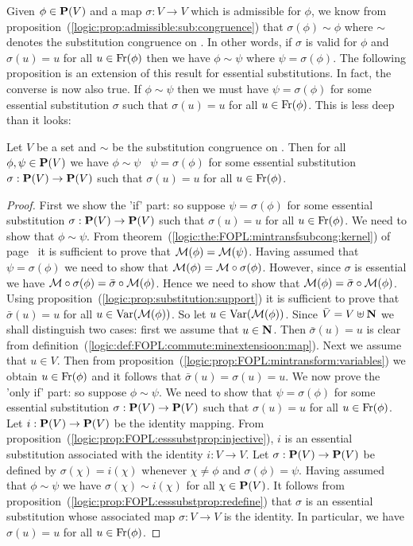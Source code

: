 Given $\phi\in\mbox{${\bf P}(V)$}$ and a map $\sigma:V\to V$ which is admissible for
$\phi$, we know from
proposition~(\ref{logic:prop:admissible:sub:congruence}) that
$\sigma(\phi)\sim\phi$ where $\sim$ denotes the substitution
congruence on \pv. In other words, if $\sigma$ is valid for $\phi$
and $\sigma(u)=u$ for all $u\in\mbox{\rm Fr}(\phi)$ then we have
$\phi\sim\psi$ where $\psi=\sigma(\phi)$. The following proposition
is an extension of this result for essential substitutions. In fact,
the converse is now also true. If $\phi\sim\psi$ then we must have
$\psi=\sigma(\phi)$ for some essential substitution $\sigma$ such
that $\sigma(u)=u$ for all $u\in\mbox{\rm Fr}(\phi)$. This is less deep than
it looks:

\begin{prop}\label{logic:prop:FOPL:esssubstprop:subcong}
Let $V$ be a set and $\sim$ be the substitution congruence on \pv.
Then for all $\phi,\psi\in\mbox{${\bf P}(V)$}$ we have $\phi\sim\psi$ \ifand\
$\psi=\sigma(\phi)$ for some essential substitution
$\sigma:\mbox{${\bf P}(V)$}\to\mbox{${\bf P}(V)$}$ such that $\sigma(u)=u$ for all
$u\in\mbox{\rm Fr}(\phi)$.
\end{prop}
\begin{proof}
First we show the 'if' part: so suppose $\psi=\sigma(\phi)$ for some
essential substitution $\sigma:\mbox{${\bf P}(V)$}\to\mbox{${\bf P}(V)$}$ such that $\sigma(u)=u$
for all $u\in\mbox{\rm Fr}(\phi)$. We need to show that $\phi\sim\psi$. From
theorem~(\ref{logic:the:FOPL:mintransfsubcong:kernel}) of
page~\pageref{logic:the:FOPL:mintransfsubcong:kernel} it is
sufficient to prove that ${\cal M}(\phi)={\cal M}(\psi)$. Having
assumed that $\psi=\sigma(\phi)$ we need to show that ${\cal
M}(\phi)={\cal M}\circ\sigma(\phi)$. However, since $\sigma$ is
essential we have ${\cal M}\circ\sigma(\phi)=\bar{\sigma}\circ{\cal
M}(\phi)$. Hence we need to show that ${\cal
M}(\phi)=\bar{\sigma}\circ{\cal M}(\phi)$. Using
proposition~(\ref{logic:prop:substitution:support}) it is sufficient
to prove that $\bar{\sigma}(u)=u$ for all $u\in\mbox{\rm Var}({\cal
M}(\phi))$. So let $u\in\mbox{\rm Var}({\cal M}(\phi))$. Since
$\bar{V}=V\uplus\mbox{$\bf N$}$ we shall distinguish two cases: first we assume
that $u\in\mbox{$\bf N$}$. Then $\bar{\sigma}(u)=u$ is clear from
definition~(\ref{logic:def:FOPL:commute:minextensioon:map}). Next we
assume that $u\in V$. Then from
proposition~(\ref{logic:prop:FOPL:mintransform:variables}) we obtain
$u\in\mbox{\rm Fr}(\phi)$ and it follows that $\bar{\sigma}(u)=\sigma(u)=u$.
We now prove the 'only if' part: so suppose $\phi\sim\psi$. We need
to show that $\psi=\sigma(\phi)$ for some essential substitution
$\sigma:\mbox{${\bf P}(V)$}\to\mbox{${\bf P}(V)$}$ such that $\sigma(u)=u$ for all
$u\in\mbox{\rm Fr}(\phi)$. Let $i:\mbox{${\bf P}(V)$}\to\mbox{${\bf P}(V)$}$ be the identity mapping. From
proposition~(\ref{logic:prop:FOPL:esssubstprop:injective}), $i$ is
an essential substitution associated with the identity $i:V\to V$.
Let $\sigma:\mbox{${\bf P}(V)$}\to\mbox{${\bf P}(V)$}$ be defined by $\sigma(\chi)=i(\chi)$ whenever
$\chi\neq\phi$ and $\sigma(\phi)=\psi$. Having assumed that
$\phi\sim\psi$ we have $\sigma(\chi)\sim i(\chi)$ for all
$\chi\in\mbox{${\bf P}(V)$}$. It follows from
proposition~(\ref{logic:prop:FOPL:esssubstprop:redefine}) that
$\sigma$ is an essential substitution whose associated map
$\sigma:V\to V$ is the identity. In particular, we have
$\sigma(u)=u$ for all $u\in\mbox{\rm Fr}(\phi)$.
\end{proof}

